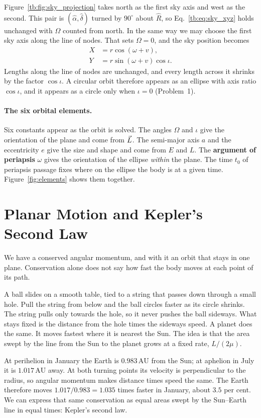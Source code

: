 	Figure~\ref{tb:fig:sky_projection} takes north as the first sky axis and west as the second. This pair is $(\hat\alpha,\hat\delta)$ turned by $90^\circ$ about $\hat R$, so Eq.~\eqref{tb:eq:sky_xyz} holds unchanged with $\Omega$ counted from north. In the same way we may choose the first sky axis along the line of nodes. That sets $\Omega=0$, and the sky position becomes
	\begin{align}
		X &= r\cos(\omega+v),\\
		Y &= r\sin (\omega+v)\cos\iota.
	\end{align}
	Lengths along the line of nodes are unchanged, and every length across it shrinks by the factor $\cos\iota$. A circular orbit therefore appears as an ellipse with axis ratio $\cos\iota$, and it appears as a circle only when $\iota=0$ (Problem~1).
	\paragraph{The six orbital elements.} Six constants appear as the orbit is solved. The angles $\Omega$ and $\iota$ give the orientation of the plane and come from $\vec L$. The semi-major axis $a$ and the eccentricity $e$ give the size and shape and come from $E$ and $L$. The \textbf{argument of periapsis} $\omega$ gives the orientation of the ellipse \emph{within} the plane. The time $t_0$ of periapsis passage fixes where on the ellipse the body is at a given time. Figure~\ref{fig:elements} shows them together.
	
	\section{Planar Motion and Kepler's Second Law}
	\label{tb:sec:planar}

	We have a conserved angular momentum, and with it an orbit that stays in one plane. 	Conservation alone does not say how fast the body moves at each point of its path.

	A ball slides on a smooth table, tied to a string that passes down through a small hole. Pull the string from below and the ball circles faster as its circle shrinks. The string pulls only towards the hole, so it never pushes the ball sideways. What stays fixed is the distance from the hole times the sideways speed. 	A planet does the same. It moves fastest where it is nearest the Sun. The idea is that the area swept by the line from the Sun to the planet grows at a fixed rate, $L/(2\mu)$.

	At perihelion in January the Earth is $0.983\,\mathrm{AU}$ from the Sun; at aphelion in July it is $1.017\,\mathrm{AU}$ away. At both turning points its velocity is perpendicular to the radius, so angular momentum makes distance times speed the same. The Earth therefore moves $1.017/0.983=1.035$ times faster in January, about $3.5$ per cent. We can express that same conservation as equal areas swept by the Sun--Earth line in equal times: Kepler's second law.


